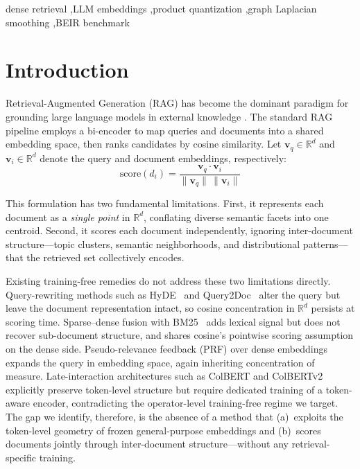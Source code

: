 \documentclass[review,1p]{elsarticle}
\newcommand{\R}{\mathbb{R}}
\begin{document}
\begin{frontmatter}
\begin{keyword}
dense retrieval \sep LLM embeddings \sep product quantization \sep graph Laplacian smoothing \sep BEIR benchmark
\end{keyword}

\end{frontmatter}

\section{Introduction}
\label{sec:introduction}

Retrieval-Augmented Generation (RAG) has become the dominant paradigm for grounding large language models in external knowledge \citep{lewis2020rag,guu2020realm}. The standard RAG pipeline employs a bi-encoder to map queries and documents into a shared embedding space, then ranks candidates by cosine similarity. Let $\mathbf{v}_q \in \R^d$ and $\mathbf{v}_i \in \R^d$ denote the query and document embeddings, respectively:
\begin{equation}
\label{eq:cosine}
\text{score}(d_i) = \frac{\mathbf{v}_q \cdot \mathbf{v}_i}{\|\mathbf{v}_q\| \, \|\mathbf{v}_i\|}
\end{equation}

This formulation has two fundamental limitations. First, it represents each document as a \textit{single point} in $\R^d$, conflating diverse semantic facets into one centroid. Second, it scores each document independently, ignoring inter-document structure---topic clusters, semantic neighborhoods, and distributional patterns---that the retrieved set collectively encodes.

Existing training-free remedies do not address these two limitations directly. Query-rewriting methods such as HyDE~\citep{gao2023hyde} and Query2Doc~\citep{wang2023query2doc} alter the query but leave the document representation intact, so cosine concentration in $\R^d$ persists at scoring time. Sparse--dense fusion with BM25~\citep{robertson2009bm25} adds lexical signal but does not recover sub-document structure, and shares cosine's pointwise scoring assumption on the dense side. Pseudo-relevance feedback (PRF) over dense embeddings~\citep{li2023ance-prf} expands the query in embedding space, again inheriting concentration of measure. Late-interaction architectures such as ColBERT and ColBERTv2~\citep{khattab2020colbert,santhanam2022colbertv2} explicitly preserve token-level structure but require dedicated training of a token-aware encoder, contradicting the operator-level training-free regime we target. The gap we identify, therefore, is the absence of a method that (a)~exploits the token-level geometry of frozen general-purpose embeddings and (b)~scores documents jointly through inter-document structure---without any retrieval-specific training.
\end{document}
